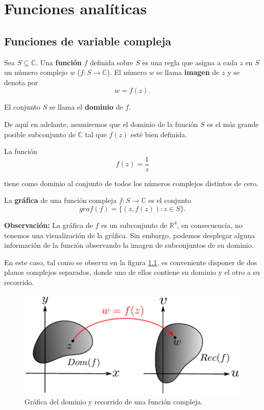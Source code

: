 \chapter{Funciones analíticas}

\section{Funciones de variable compleja}

\begin{defi}
Sea $S \subseteq \mathbb{C}$. Una \textbf{función} $f$ definida sobre $S$ es una regla que asigna a cada $z$ en $S$ un número complejo $w$ ($f: S \longrightarrow \mathbb{C}$). El número $w$ se llama \textbf{imagen} de $z$ y se denota por
$$w = f(z).$$

El conjunto $S$ se llama el \textbf{dominio} de $f$.
\end{defi}

De aquí en adelante, asumiremos que el dominio de la función $S$ es el más grande posible subconjunto de $\mathbb{C}$ tal que $f(z)$ esté bien definida.

\begin{ejemplo}
La función 
$$f(z) = \frac{1}{z}$$

tiene como dominio al conjunto de todos los números complejos distintos de cero.
\end{ejemplo}

\begin{defi}
La \textbf{gráfica} de una función compleja $f: S \longrightarrow \mathbb{C}$ es el conjunto
$$graf(f) = \{(z,f(z)) : z \in S\}.$$
\end{defi}

\textbf{Observación:} La gráfica de $f$ es un subconjunto de $\mathbb{R}^4$, en consecuencia, no tenemos una visualización de la gráfica. Sin embargo, podemos desplegar alguna información de la función observando la imagen de subconjuntos de su dominio.

En este caso, tal como se observa en la figura \ref{FUncionCompleja}, es conveniente disponer de dos planos complejos separados, donde uno de ellos contiene su dominio y el otro a su recorrido.

\begin{figure}[H]
    \centering
    \includegraphics[scale=0.65]{Figuras/FuncionDomRec.pdf}
    \caption{Gráfica del dominio y recorrido de una función compleja.}
    \label{FUncionCompleja}
\end{figure}

